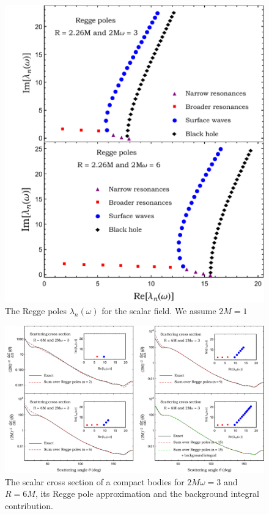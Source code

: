 \documentclass[aps,prd,longbibliography,reprint,twocolumn,amsmath,amssymb,amsfonts,showpacs,superscriptaddress]{revtex4-1}%
\begin{document}
 \begin{figure}[htb]
\centering
 \includegraphics[scale=0.50]{RP_R_2_dot_26_2Mw_3_6}
\caption{\label{RP_approx_2Mw_3_6_s_1} The Regge poles $\lambda_n(\omega)$ for the scalar field. We assume $2M =1$}
\end{figure}


\begin{figure}%
 \includegraphics[scale=0.50]{Scattering_Cross_Section_R_6_2Mw_3}
\caption{\label{S_0_2Mw_01_Exact_vs_CAM} The scalar cross section of a compact bodies for $2M\omega=3$ and $R=6M$, its Regge pole approximation and the background integral contribution.}
\end{figure}
\end{document}
